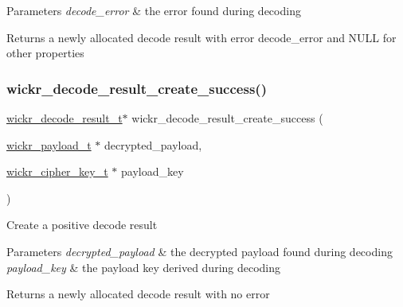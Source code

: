 \begin{DoxyParams}{Parameters}
{\em decode\+\_\+error} & the error found during decoding \\
\hline
\end{DoxyParams}
\begin{DoxyReturn}{Returns}
a newly allocated decode result with error \textquotesingle{}decode\+\_\+error\textquotesingle{} and N\+U\+LL for other properties 
\end{DoxyReturn}
\mbox{\label{group__wickr__protocol_ga633aaf4cb6159be0110401f06dae458c}} 
\subsubsection{\texorpdfstring{wickr\+\_\+decode\+\_\+result\+\_\+create\+\_\+success()}{wickr\_decode\_result\_create\_success()}}
{\footnotesize\ttfamily \mbox{\hyperlink{structwickr__decode__result}{wickr\+\_\+decode\+\_\+result\+\_\+t}}$\ast$ wickr\+\_\+decode\+\_\+result\+\_\+create\+\_\+success (\begin{DoxyParamCaption}\item[{\mbox{\hyperlink{structwickr__payload}{wickr\+\_\+payload\+\_\+t}} $\ast$}]{decrypted\+\_\+payload,  }\item[{\mbox{\hyperlink{structwickr__cipher__key}{wickr\+\_\+cipher\+\_\+key\+\_\+t}} $\ast$}]{payload\+\_\+key }\end{DoxyParamCaption})}

Create a positive decode result


\begin{DoxyParams}{Parameters}
{\em decrypted\+\_\+payload} & the decrypted payload found during decoding \\
\hline
{\em payload\+\_\+key} & the payload key derived during decoding \\
\hline
\end{DoxyParams}
\begin{DoxyReturn}{Returns}
a newly allocated decode result with no error 
\end{DoxyReturn}
\mbox{\label{group__wickr__protocol_ga94154ab44a6c2e9b97a115e37416efe1}} 
